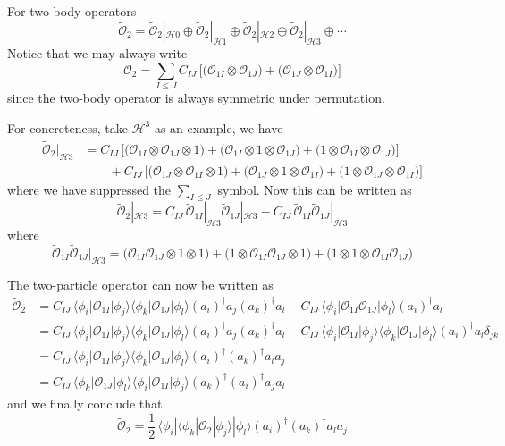 \documentclass[12pt, oneside]{book}
\begin{document}
For two-body operators
\[
\widetilde{\mathcal{O}}_2=\widetilde{\mathcal{O}}_2|_{\mathcal{H}0}\oplus\widetilde{\mathcal{O}}_2|_{\mathcal{H}1}\oplus\widetilde{\mathcal{O}}_2|_{\mathcal{H}2}\oplus\widetilde{\mathcal{O}}_2|_{\mathcal{H}3}\oplus\cdots
\]
Notice that we may always write
\[
\mathcal{O}_2=\sum_{I\le J}C_{IJ}\,\big[\big(\mathcal{O}_{1I}\otimes\mathcal{O}_{1J}\big)+\big(\mathcal{O}_{1J}\otimes\mathcal{O}_{1I}\big)\big]
\]
since the two-body operator is always symmetric under permutation.

For concreteness, take $\mathcal{H}^3$ as an example, we have
\begin{align*}
\widetilde{\mathcal{O}}_2|_{\mathcal{H}3}
&=C_{IJ}\,\big[\big(\mathcal{O}_{1I}\otimes\mathcal{O}_{1J}\otimes1\big)+\big(\mathcal{O}_{1I}\otimes1\otimes\mathcal{O}_{1J}\big)+\big(1\otimes\mathcal{O}_{1I}\otimes\mathcal{O}_{1J}\big)\big]\\
&\qquad+C_{IJ}\,\big[\big(\mathcal{O}_{1J}\otimes\mathcal{O}_{1I}\otimes1\big)+\big(\mathcal{O}_{1J}\otimes1\otimes\mathcal{O}_{1I}\big)+\big(1\otimes\mathcal{O}_{1J}\otimes\mathcal{O}_{1I}\big)\big]
\end{align*}
where we have suppressed the $\sum_{I\le J}$ symbol. Now this can be written as
\[
\widetilde{\mathcal{O}}_2|_{\mathcal{H}3}=C_{IJ}\,\widetilde{\mathcal{O}}_{1I}|_{\mathcal{H}3}\widetilde{\mathcal{O}}_{1J}|_{\mathcal{H}3}-C_{IJ}\,\widetilde{\mathcal{O}}_{1I}\widetilde{\mathcal{O}}_{1J}|_{\mathcal{H}3}
\]
where
\[
\widetilde{\mathcal{O}}_{1I}\widetilde{\mathcal{O}}_{1J}|_{\mathcal{H}3}=\big(\mathcal{O}_{1I}\mathcal{O}_{1J}\otimes1\otimes1\big)+\big(1\otimes\mathcal{O}_{1I}\mathcal{O}_{1J}\otimes1\big)+\big(1\otimes1\otimes\mathcal{O}_{1I}\mathcal{O}_{1J}\big)
\]

The two-particle operator can now be written as
\begin{align*}
\widetilde{\mathcal{O}}_2
&=C_{IJ}\,\langle\phi_i|\mathcal{O}_{1I}|\phi_j\rangle\langle\phi_k|\mathcal{O}_{1J}|\phi_l\rangle(a_i)^{\dagger}a_j(a_k)^{\dagger}a_l-C_{IJ}\,\langle\phi_i|\mathcal{O}_{1I}\mathcal{O}_{1J}|\phi_l\rangle(a_i)^{\dagger}a_l\\
&=C_{IJ}\,\langle\phi_i|\mathcal{O}_{1I}|\phi_j\rangle\langle\phi_k|\mathcal{O}_{1J}|\phi_l\rangle(a_i)^{\dagger}a_j(a_k)^{\dagger}a_l-C_{IJ}\,\langle\phi_i|\mathcal{O}_{1I}|\phi_j\rangle\langle\phi_k|\mathcal{O}_{1J}|\phi_l\rangle(a_i)^{\dagger}a_l\delta_{jk}\\
&=C_{IJ}\,\langle\phi_i|\mathcal{O}_{1I}|\phi_j\rangle\langle\phi_k|\mathcal{O}_{1J}|\phi_l\rangle(a_i)^{\dagger}(a_k)^{\dagger}a_la_j\\
&=C_{IJ}\,\langle\phi_k|\mathcal{O}_{1J}|\phi_l\rangle\langle\phi_i|\mathcal{O}_{1I}|\phi_j\rangle(a_k)^{\dagger}(a_i)^{\dagger}a_ja_l
\end{align*}
and we finally conclude that
\[
\widetilde{\mathcal{O}}_2=\frac12\,\langle\phi_i|\langle\phi_k|\mathcal{O}_2|\phi_j\rangle|\phi_l\rangle(a_i)^{\dagger}(a_k)^{\dagger}a_la_j
\]
\end{document}
